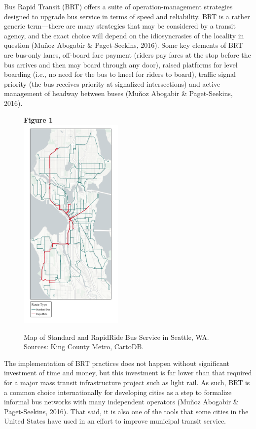 \documentclass[
  12pt,
]{article}
\begin{document}
Bus Rapid Transit (BRT) offers a suite of operation-management
strategies designed to upgrade bus service in terms of speed and
reliability. BRT is a rather generic term---there are many strategies
that may be considered by a transit agency, and the exact choice will
depend on the idiosyncrasies of the locality in question (Muňoz Abogabir
\& Paget-Seekins, 2016). Some key elements of BRT are bus-only lanes,
off-board fare payment (riders pay fares at the stop before the bus
arrives and then may board through any door), raised platforms for level
boarding (i.e., no need for the bus to kneel for riders to board),
traffic signal priority (the bus receives priority at signalized
intersections) and active management of headway between buses (Muňoz
Abogabir \& Paget-Seekins, 2016).

\begin{figure}
  \vspace{-10pt}
  \centering
  \textbf{Figure 1}\\
  \includegraphics[width=0.45\textwidth]{route_map.png}
  \singlespacing\caption{Map of Standard and RapidRide Bus Service in Seattle, WA. Sources: King County Metro, CartoDB.}
  \vspace{-20pt}
\end{figure}

The implementation of BRT practices does not happen without significant
investment of time and money, but this investment is far lower than that
required for a major mass transit infrastructure project such as light
rail. As such, BRT is a common choice internationally for developing
cities as a step to formalize informal bus networks with many
independent operators (Muňoz Abogabir \& Paget-Seekins, 2016). That
said, it is also one of the tools that some cities in the United States
have used in an effort to improve municipal transit service.
\end{document}
